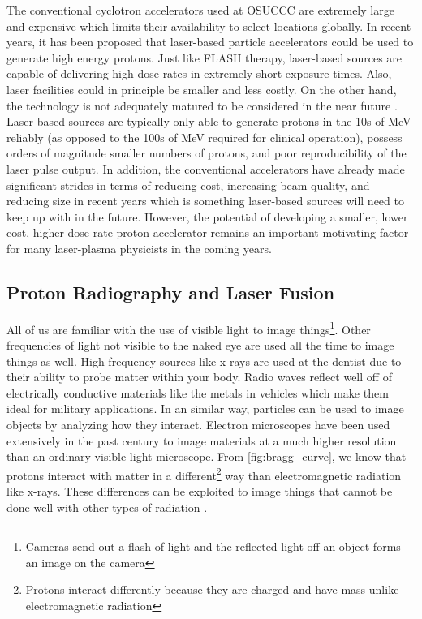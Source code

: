 The conventional cyclotron accelerators used at \gls{OSUCCC} are extremely large and expensive which limits their availability to select locations globally. In recent years, it has been proposed that laser-based particle accelerators could be used to generate high energy protons. Just like FLASH therapy, laser-based sources are capable of delivering high dose-rates in extremely short exposure times. Also, laser facilities could in principle be smaller and less costly. On the other hand, the technology is not adequately matured to be considered in the near future \cite{Linz_2016_LaPB}. Laser-based sources are typically only able to generate protons in the 10s of MeV reliably (as opposed to the 100s of MeV required for clinical operation), possess orders of magnitude smaller numbers of protons, and poor reproducibility of the laser pulse output. In addition, the conventional accelerators have already made significant strides in terms of reducing cost, increasing beam quality, and reducing size in recent years \cite{Linz_2016_LaPB} which is something laser-based sources will need to keep up with in the future. However, the potential of developing a smaller, lower cost, higher dose rate proton accelerator remains an important motivating factor for many laser-plasma physicists in the coming years.

\subsection{Proton Radiography and Laser Fusion}

All of us are familiar with the use of visible light to image things\footnote{Cameras send out a flash of light and the reflected light off an object forms an image on the camera}. Other frequencies of light not visible to the naked eye are used all the time to image things as well. High frequency sources like x-rays are used at the dentist due to their ability to probe matter within your body. Radio waves reflect well off of electrically conductive materials like the metals in vehicles which make them ideal for military applications. In an similar way, particles can be used to image objects by analyzing how they interact. Electron microscopes have been used extensively in the past century to image materials at a much higher resolution than an ordinary visible light microscope. From \autoref{fig:bragg_curve}, we know that protons interact with matter in a different\footnote{Protons interact differently because they are charged and have mass unlike electromagnetic radiation} way than electromagnetic radiation like x-rays. These differences can be exploited to image things that cannot be done well with other types of radiation \cite{Schaeffer_2023_RevMod}.

